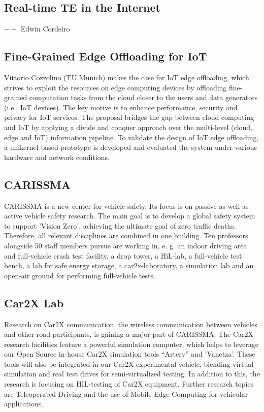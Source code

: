 \subsection{Real-time TE in the Internet}
$--$ Edwin Cordeiro

\subsection{Fine-Grained Edge Offloading for IoT}

Vittorio Cozzolino (TU Munich) makes the case for \ac{IoT} edge offloading,
which strives to exploit the resources on edge computing devices by offloading
fine-grained computation tasks from the cloud closer to the users and data
generators (i.e., IoT devices). The key motive is to enhance performance,
security and privacy for IoT services. The proposal bridges the gap between
cloud computing and IoT by applying a divide and conquer approach over the
multi-level (cloud, edge and IoT) information pipeline.  To validate the
design of IoT edge offloading, a unikernel-based prototype is developed and
evaluated the system under various hardware and network conditions.

\subsection{CARISSMA}

\ac{CARISSMA} is a new center for vehicle safety. Its focus is on passive as
well as active vehicle safety research. The main goal is to develop a global
safety system to support 'Vision Zero', achieving the ultimate goal of zero
traffic deaths. Therefore, all relevant disciplines are combined in one
building. Ten professors alongside 50 staff members pursue are working in, e.
g. an indoor driving area and full-vehicle crash test facility, a drop tower,
a HiL-lab, a full-vehicle test bench, a lab for safe energy storage, a
car2x-laboratory, a simulation lab and an open-air ground for performing
full-vehicle tests.

\subsection{Car2X Lab}

Research on Car2X communication, the wireless communication between vehicles
and other road participants, is gaining a major part of \ac{CARISSMA}. The
Car2X research facilities feature a powerful simulation computer, which helps
to leverage our Open Source in-house Car2X simulation tools “Artery” and
'Vanetza'. These tools will also be integrated in our Car2X experimental
vehicle, blending virtual simulation and real test drives for semi-virtualized
testing. In addition to this, the research is focusing on HIL-testing of Car2X
equipment. Further research topics are Teleoperated Driving and the use of
Mobile Edge Computing for vehicular applications.
